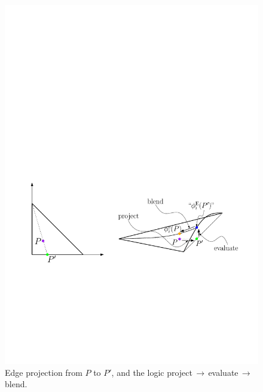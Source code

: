 \begin{figure}[!ht]
\begin{center}
\includegraphics[scale=0.55]{./figures/TriangleProjection.pdf}
\caption{Edge projection from $P$ to $P'$, and the logic project$\,\to\,$evaluate$\,\to\,$blend.}
\label{fig:TriangleProjection}
\end{center}
\end{figure}

